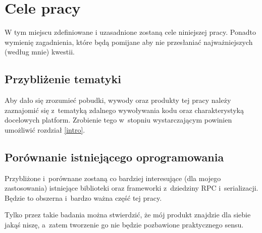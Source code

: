 
\section{Cele pracy}
W tym miejscu zdefiniowane i uzasadnione zostaną cele niniejszej pracy. Ponadto wymienię zagadnienia, które będą pomijane aby nie przesłaniać najważniejszych (według mnie) kwestii.


\subsection{Przybliżenie tematyki}
Aby dało się zrozumieć pobudki, wywody oraz produkty tej pracy należy zaznajomić się z~tematyką zdalnego wywoływania kodu oraz charakterystyką docelowych platform. Zrobienie tego w~stopniu wystarczającym powinien umożliwić rozdział \ref{intro}.

\subsection{Porównanie istniejącego oprogramowania}
Przybliżone i~porównane zostaną co bardziej interesujące (dla mojego zastosowania) istniejące biblioteki oraz frameworki z~dziedziny RPC i~serializacji. Będzie to obszerna i~bardzo ważna część tej pracy.

Tylko przez takie badania można stwierdzić, że mój produkt znajdzie dla siebie jakąś niszę, a~zatem tworzenie go nie będzie pozbawione praktycznego sensu.

